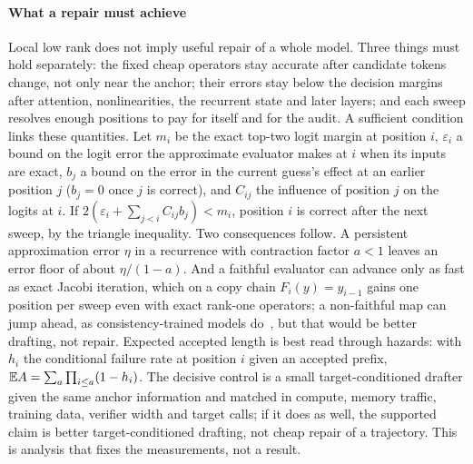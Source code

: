 \paragraph{What a repair must achieve}\label{sec:repair-analysis} Local low rank does not imply useful repair of a whole model. Three things must hold separately: the fixed cheap operators stay accurate after candidate tokens change, not only near the anchor; their errors stay below the decision margins after attention, nonlinearities, the recurrent state and later layers; and each sweep resolves enough positions to pay for itself and for the audit. A sufficient condition links these quantities. Let $m_i$ be the exact top-two logit margin at position $i$, $\varepsilon_i$ a bound on the logit error the approximate evaluator makes at $i$ when its inputs are exact, $b_j$ a bound on the error in the current guess's effect at an earlier position $j$ ($b_j=0$ once $j$ is correct), and $C_{ij}$ the influence of position $j$ on the logits at $i$. If $2(\varepsilon_i+\sum_{j<i}C_{ij}b_j)<m_i$, position $i$ is correct after the next sweep, by the triangle inequality. Two consequences follow. A persistent approximation error $\eta$ in a recurrence with contraction factor $a<1$ leaves an error floor of about $\eta/(1-a)$. And a faithful evaluator can advance only as fast as exact Jacobi iteration, which on a copy chain $F_i(y)=y_{i-1}$ gains one position per sweep even with exact rank-one operators; a non-faithful map can jump ahead, as consistency-trained models do~\cite{cllm}, but that would be better drafting, not repair. Expected accepted length is best read through hazards: with $h_i$ the conditional failure rate at position $i$ given an accepted prefix, $\mathbb E A=\sum_a\prod_{i\le a}(1-h_i)$. The decisive control is a small target-conditioned drafter given the same anchor information and matched in compute, memory traffic, training data, verifier width and target calls; if it does as well, the supported claim is better target-conditioned drafting, not cheap repair of a trajectory. This is analysis that fixes the measurements, not a result.

